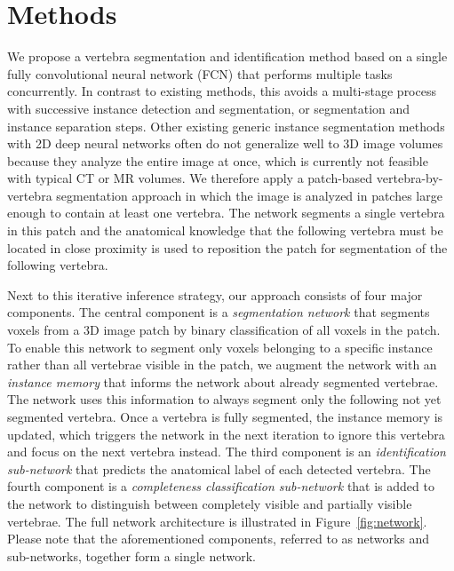 \documentclass[authoryear,5p,final,times]{elsarticle}
\begin{document}
    \section{Methods}

    We propose a vertebra segmentation and identification method based on a single fully convolutional neural network (FCN) that performs multiple tasks concurrently. In contrast to existing methods, this avoids a multi-stage process with successive instance detection and segmentation, or segmentation and instance separation steps. Other existing generic instance segmentation methods with 2D deep neural networks often do not generalize well to 3D image volumes because they analyze the entire image at once, which is currently not feasible with typical CT or MR volumes. We therefore apply a patch-based vertebra-by-vertebra segmentation approach in which the image is analyzed in patches large enough to contain at least one vertebra. The network segments a single vertebra in this patch and the anatomical knowledge that the following vertebra must be located in close proximity is used to reposition the patch for segmentation of the following vertebra.

    Next to this iterative inference strategy, our approach consists of four major components. The central component is a \emph{segmentation network} that segments voxels from a 3D image patch by binary classification of all voxels in the patch. To enable this network to segment only voxels belonging to a specific instance rather than all vertebrae visible in the patch, we augment the network with an \emph{instance memory} that informs the network about already segmented vertebrae. The network uses this information to always segment only the following not yet segmented vertebra. Once a vertebra is fully segmented, the instance memory is updated, which triggers the network in the next iteration to ignore this vertebra and focus on the next vertebra instead. The third component is an \emph{identification sub-network} that predicts the anatomical label of each detected vertebra. The fourth component is a \emph{completeness classification sub-network} that is added to the network to distinguish between completely visible and partially visible vertebrae. The full network architecture is illustrated in Figure~\ref*{fig:network}. Please note that the aforementioned components, referred to as networks and sub-networks, together form a single network.
\end{document}
